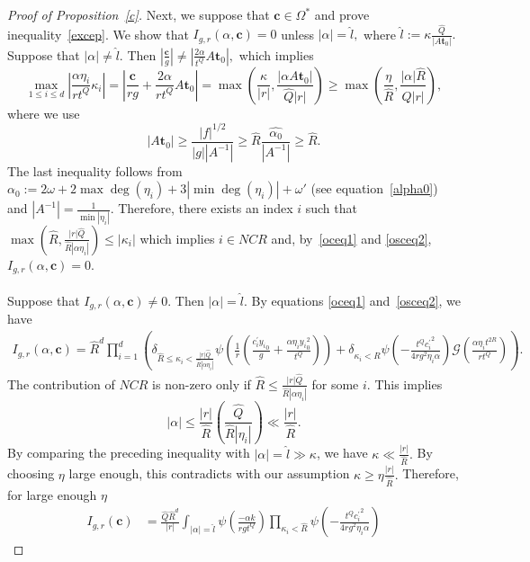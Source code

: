 \documentclass[10pt]{amsart}
\theoremstyle{plain}
\theoremstyle{plain}
\renewcommand{\vec}[1]{\mathbf{#1}}
\theoremstyle{remark}
\theoremstyle{definition}
\renewcommand{\hat}{\widehat}
\newcommand{\hQ}{\widehat{Q}}
\newcommand{\hR}{\widehat{R}}
\newcommand{\hl}{\widehat l}
\newcommand{\cG}{\mathcal{G}}
\begin{document}
\begin{proof}[Proof of Proposition~\ref{c}]
 Next, we suppose that $\vec{c}\in\Omega^*$ and prove inequality~\eqref{excep}. We show that    $I_{g,r}(\alpha, \vec{c})=0$ unless 
 \(
 |\alpha|= \hl,
\)
where $\hl:= \kappa \frac{\hQ}{|A\vec{t}_0|}.$  Suppose that $|\alpha|\neq \hl$. Then $\left| \frac{\vec{c}}{g}\right| \neq \left| \frac{2\alpha}{t^Q}A\vec{t}_0\right|,$ which implies 
\[
\max_{1\leq i\leq d} |\frac{\alpha \eta_i }{rt^{Q}} \kappa_i |= \left| \frac{\vec{c}}{rg}+ \frac{2\alpha}{rt^Q}A\vec{t}_0\right| =  \max \left( \frac{\kappa}{|r|}, \frac{|\alpha A\vec{t}_0|}{\hQ|r|}  \right) \geq  \max\left(\frac{\eta}{\hR}, \frac{|\alpha| \hR}{\hQ|r|}  \right),
\]
where we use 
\[
| A\vec{t}_0|\geq \frac{|f|^{1/2}}{|g| |A^{-1}|} \geq \hR \frac{\hat{\alpha_0}}{|A^{-1}|} \geq \hR.
\]
The last inequality follows from $\alpha_0:=2\omega+2\max{\deg(\eta_i)}+3|\min\deg(\eta_i)|+\omega'$ (see equation~\eqref{alpha0}) and $|A^{-1}|=\frac{1}{\min|\eta_i|}.$ Therefore, there exists an index $i$ such that 
\(
\max(\hR , \frac{|r|\hQ}{\hR|\alpha \eta_i|})\leq    |\kappa_i| 
\)
which implies $i\in NCR$ and, by~\eqref{oceq1} and \eqref{osceq2}, $I_{g,r}(\alpha, \vec{c})=0.$
\\
\\
Suppose that $I_{g,r}(\alpha, \vec{c})\neq 0.$ Then  $|\alpha|= \hl.$  By equations \eqref{oceq1} and~\eqref{osceq2}, we have
\begin{equation}\label{oscformula}
\begin{split}
I_{g,r}(\alpha,\vec{c})=\hR^d\prod_{i=1}^d \left(
  \delta_{\hR \leq \kappa_i < \frac{|r|\hQ}{\hR|\alpha \eta_i|}} \psi \left( \frac{1}{r} \left( \frac{c_i^{\prime}{y_i}_0}{g} +\frac{\alpha  \eta_i {y_i}_0^2}{t^Q}   \right)\right)  +\delta_{\kappa_i<\hR}  \psi (-\frac{t^Q{c_i^{\prime}}^2}{4rg^2\eta_i \alpha})\cG\left(\frac{\alpha \eta_i t^{2R}}{rt^Q}\right)\right).
\end{split}
\end{equation}
The contribution of $NCR$ is non-zero  only if
\(
\hR \leq \frac{|r|\hQ}{\hR|\alpha \eta_i|}
\) for some $i$. This implies 
\[
|\alpha|\leq  \frac{|r|}{\hR} \left(\frac{\hQ}{\hR|\eta_i|}  \right) \ll   \frac{|r|}{\hR}.
\]
By comparing the preceding inequality with $ |\alpha|=\hl \gg \kappa $, we have 
\(
\kappa\ll \frac{|r|}{\hR}.
\)  
By choosing $\eta$ large enough, this contradicts with our assumption $\kappa \geq \eta  \frac{|r|}{\hR}. $ Therefore, for large enough $\eta$
 \begin{equation*}
\begin{split}
I_{g,r}(\vec{c})&=\frac{\hQ\hR^{d}}{|r|} \int _{ |\alpha|=\hl  }  \psi(\frac{-\alpha k}{rgt^Q})  \prod_{\kappa_i<\hR} \psi (-\frac{{t^Qc_i^{\prime}}^2}{4rg^2\eta_i \alpha}) 

\end{split}
\end{equation*}
\end{proof}
\end{document}
